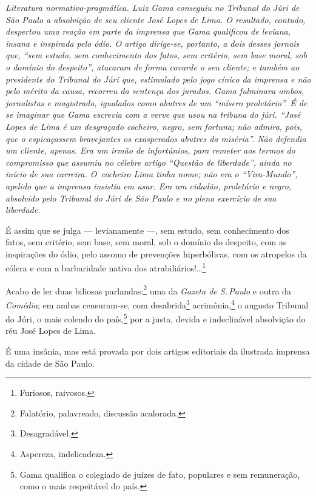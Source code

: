 \begin{resumo}
\emph{Literatura normativo-pragmática. Luiz Gama conseguiu no Tribunal
do Júri de São Paulo a absolvição de seu cliente José Lopes de Lima. O
resultado, contudo, despertou uma reação em parte da imprensa que Gama
qualificou de leviana, insana e inspirada pelo ódio. O artigo
dirige-se, portanto, a dois desses jornais que, ``sem estudo, sem
conhecimento dos fatos, sem critério, sem base moral, sob o domínio do
despeito'', atacaram de forma covarde o seu cliente; e também ao
presidente do Tribunal do Júri que, estimulado pelo jogo cínico da
imprensa e não pelo mérito da causa, recorreu da sentença dos jurados.
Gama fulminava ambos, jornalistas e magistrado, igualados como abutres
de um ``mísero proletário''. É de se imaginar que Gama escrevia com a
verve que usou na tribuna do júri. ``José Lopes de Lima é um desgraçado
cocheiro, negro, sem fortuna; não admira, pois, que o espicaçassem
bravejantes os exasperados abutres da miséria''. Não defendia um cliente,
apenas. Era um irmão de infortúnios, para remeter aos termos do
compromisso que assumiu no célebre artigo ``Questão de liberdade'', ainda no início de sua carreira. O~cocheiro Lima tinha nome; não era o ``Vira-Mundo'', apelido que a imprensa insistia em usar. Era um
cidadão, proletário e negro, absolvido pelo Tribunal do Júri de São
Paulo e no pleno exercício de sua liberdade. }
\end{resumo}

É assim que se julga --- levianamente ---, sem estudo, sem
conhecimento dos fatos, sem critério, sem base, sem moral, sob o domínio
do despeito, com as inspirações do ódio, pelo assomo de prevenções
hiperbólicas, com os atropelos da cólera e com a barbaridade nativa dos
atrabiliários!\ldots{}\footnote{Furiosos, raivosos.}

Acabo de ler duas biliosas parlandas:\footnote{Falatório, palavreado,
  discussão acalorada.} uma da \textit{Gazeta de S.\,Paulo} e outra da
\textit{Comédia}; em ambas censuram-se, com desabrida\footnote{
  Desagradável.} acrimônia,\footnote{Aspereza, indelicadeza.} o
augusto Tribunal do Júri, o mais colendo do país,\footnote{Gama
  qualifica o colegiado de juízes de fato, populares e sem remuneração,
  como o mais respeitável do país.} por a justa, devida e indeclinável
absolvição do réu José Lopes de Lima.

É uma insânia, mas está provada por dois artigos editoriais da ilustrada
imprensa da cidade de São Paulo.

